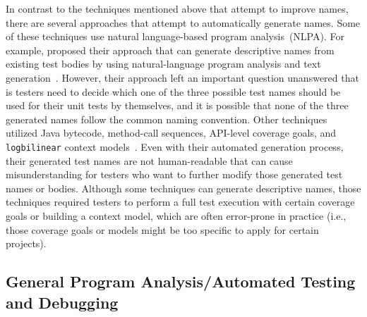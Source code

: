In contrast to the techniques mentioned above that attempt to improve names, there are several approaches that attempt to automatically generate names.
%
Some of these techniques use natural language-based program analysis~(NLPA).
%
For example, \citeauthor{zhang2016towards} proposed their approach that can generate descriptive names from existing test bodies by using natural-language program analysis and text generation~\cite{zhang2016towards}.
%
However, their approach left an important question unanswered that is testers need to decide which one of the three possible test names should be used for their unit tests by themselves, and it is possible that none of the three generated names follow the common naming convention.
%
Other techniques utilized Java bytecode, method-call sequences, API-level coverage goals, and \texttt{logbilinear} context models~\cite{fraser2011evosuite,thummalapenta2009mseqgen,daka2017generating,allamanis2015suggesting}.
%
Even with their automated generation process, their generated test names are not human-readable that can cause misunderstanding for testers who want to further modify those generated test names or bodies.
Although some techniques can generate descriptive names, those techniques required testers to perform a full test execution with certain coverage goals or building a context model, which are often error-prone in practice (i.e., those coverage goals or models might be too specific to apply for certain projects).


\subsection{General Program Analysis\slash Automated Testing and Debugging}

